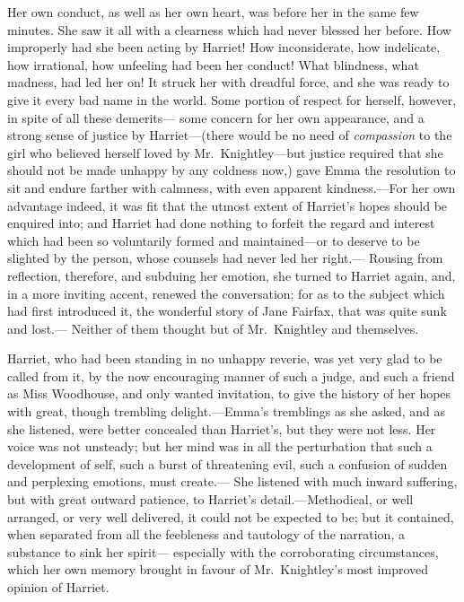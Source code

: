 Her own conduct, as well as her own heart, was before her in the
same few minutes.  She saw it all with a clearness which had
never blessed her before.  How improperly had she been acting
by Harriet!  How inconsiderate, how indelicate, how irrational,
how unfeeling had been her conduct!  What blindness, what madness,
had led her on!  It struck her with dreadful force, and she
was ready to give it every bad name in the world.  Some portion
of respect for herself, however, in spite of all these demerits---%
some concern for her own appearance, and a strong sense of justice
by Harriet---(there would be no need of \emph{compassion} to the girl
who believed herself loved by Mr.\ Knightley---but justice required
that she should not be made unhappy by any coldness now,)
gave Emma the resolution to sit and endure farther with calmness,
with even apparent kindness.---For her own advantage indeed, it was fit
that the utmost extent of Harriet's hopes should be enquired into;
and Harriet had done nothing to forfeit the regard and interest
which had been so voluntarily formed and maintained---or to deserve
to be slighted by the person, whose counsels had never led her right.---%
Rousing from reflection, therefore, and subduing her emotion,
she turned to Harriet again, and, in a more inviting accent, renewed
the conversation; for as to the subject which had first introduced it,
the wonderful story of Jane Fairfax, that was quite sunk and lost.---%
Neither of them thought but of Mr.\ Knightley and themselves.

Harriet, who had been standing in no unhappy reverie, was yet very glad
to be called from it, by the now encouraging manner of such a judge,
and such a friend as Miss Woodhouse, and only wanted invitation,
to give the history of her hopes with great, though trembling
delight.---Emma's tremblings as she asked, and as she listened,
were better concealed than Harriet's, but they were not less.
Her voice was not unsteady; but her mind was in all the perturbation
that such a development of self, such a burst of threatening evil,
such a confusion of sudden and perplexing emotions, must create.---%
She listened with much inward suffering, but with great outward
patience, to Harriet's detail.---Methodical, or well arranged,
or very well delivered, it could not be expected to be;
but it contained, when separated from all the feebleness and
tautology of the narration, a substance to sink her spirit---%
especially with the corroborating circumstances, which her own memory
brought in favour of Mr.\ Knightley's most improved opinion of Harriet.

